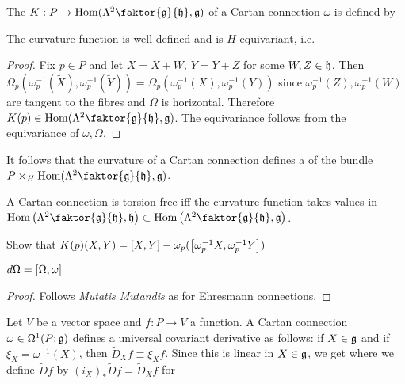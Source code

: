 \documentclass{article}
\begin{document}
\begin{definition}
	The  $K : P \to \Hom(\Lambda^2 \faktor{\mf{g}}{\mf{h}},\mf{g})$ of a Cartan connection $\omega$ is defined by 
\end{definition}

\begin{lemma}
	The curvature function is well defined and is $H$-equivariant, i.e. 
\end{lemma}
\begin{proof}
	Fix $p \in P $ and let $\tilde{X} = X + W, \, \tilde{Y} = Y+Z$ for some $W,Z \in \mf{h}$. Then $\Omega_p(\omega_p^{-1}(\tilde{X}),\omega_p^{-1}(\tilde{Y})) = \Omega_p(\omega_p^{-1}(X),\omega_p^{-1}(Y))$ since $\omega_p^{-1}(Z),\omega_p^{-1}(W)$ are tangent to the fibres and $\Omega$ is horizontal. Therefore $K(p) \in \Hom(\Lambda^2 \faktor{\mf{g}}{\mf{h}},\mf{g})$. The equivariance follows from the equivariance of $\omega, \Omega$. 
\end{proof}

It follows that the curvature of a Cartan connection defines a  of the bundle\\
${P \times_H \Hom(\Lambda^2 \faktor{\mf{g}}{\mf{h}},\mf{g})}$. 

\begin{prop}
	A Cartan connection is torsion free iff the curvature function takes values in \\ $\Hom\pround{\Lambda^2 \faktor{\mf{g}}{\mf{h}},\mf{h}} \subset \Hom\pround{\Lambda^2 \faktor{\mf{g}}{\mf{h}},\mf{g}}$. 
\end{prop}

\begin{ex}
	Show that $K(p)(X,Y) = \comm[X]{Y} - \omega_p(\comm[\omega_p^{-1}X]{\omega_p^{-1}Y})$
\end{ex}

\begin{lemma}
	$d\Omega = \comm[\Omega]{\omega}$
\end{lemma}
\begin{proof}
	Follows \textit{Mutatis Mutandis} as for Ehresmann connections. 
\end{proof}

Let $V$ be a vector space and $f: P \to V$ a function. A Cartan connection $\omega \in \Omega^1(P;\mf{g})$ defines a universal covariant derivative as follows: if $X \in \mf{g}$ and if $\xi_X = \omega^{-1}(X)$, then $\tilde{D}_X f \equiv \xi_X f$. Since this is linear in $X \in \mf{g}$, we get 
where we define $\tilde{D}f$ by $(i_X)_\ast \tilde{D}f = \tilde{D}_X f$ for 
\end{document}
